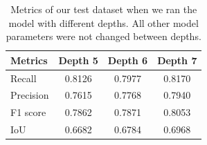 \documentclass[acmtog, authorversion]{acmart}
\begin{document}
\begin{table}
    \caption{Metrics of our test dataset when we ran the model with different depths. All other model parameters were not changed between depths.}
    \label{tab:depths}
    \begin{tabular}{l|c|c|c}
        \toprule
        Metrics & Depth 5 & Depth 6 & Depth 7\\
        \midrule
        Recall & 0.8126 & 0.7977 & 0.8170\\
        Precision & 0.7615 & 0.7768 & 0.7940\\
        F1 score & 0.7862 & 0.7871 & 0.8053\\
        IoU & 0.6682 & 0.6784 & 0.6968\\
        \bottomrule
    \end{tabular}
\end{table}
\end{document}
